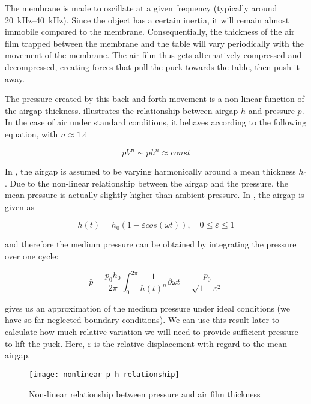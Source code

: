 The membrane is made to oscillate at a given frequency (typically around
\SIrange{20}{40}{\kilo\hertz}). Since the object has a certain inertia, it will
remain almost immobile compared to the membrane. Consequentially, the thickness
of the air film trapped between the membrane and the table will vary
periodically with the movement of the membrane. The air film thus gets
alternatively compressed and decompressed, creating forces that pull the puck
towards the table, then push it away. 

The pressure created by this back and forth movement is a non-linear function of
the airgap thickness.  illustrates the
relationship between airgap $h$ and pressure $p$. In the case of air under
standard conditions, it behaves according to the following equation, with $n
\approx 1.4$

\begin{equation}
  pV^{n} \sim ph^{n} \approx const
  \label{eqn:pv-ph}
\end{equation}

In , the airgap is assumed to be varying
harmonically around a mean thickness $h_0$. Due to the non-linear relationship
between the airgap and the pressure, the mean pressure is actually slightly
higher than ambient pressure. In \cite{wiesendanger2001}, the airgap is given as

\begin{equation}
  h(t) = h_0 (1 - \varepsilon cos(\omega t)), \quad 0 \leq \varepsilon \leq 1
  \label{eqn:airgap-periodic}
\end{equation}

and therefore the medium pressure can be obtained by integrating the pressure
over one cycle:

\begin{equation}
  \bar{p} = 
  \frac{p_0 h_0}{2\pi} \int_{0}^{2\pi}\!\frac{1}{h(t)^n} \partial \omega t = 
  \frac{p_0}{\sqrt{1-\varepsilon^2}}
  \label{eqn:pmean}
\end{equation}

 gives us an approximation of the medium pressure under ideal
conditions (we have so far neglected boundary conditions). We can use this
result later to calculate how much relative variation we will need to provide
sufficient pressure to lift the puck. Here, $\varepsilon$ is the relative
displacement with regard to the mean airgap.

\begin{figure}[h]
  \begin{center}
    \texttt{[image: nonlinear-p-h-relationship]}
  \end{center}
  \caption{Non-linear relationship between pressure and air film
  thickness\cite{wiesendanger2001}}
  \label{fig:nonlinear-relationship}
\end{figure}


